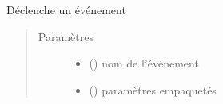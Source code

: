 \documentclass[letterpaper,10pt,french]{sphinxmanual}
\begin{document}
\begin{fulllineitems}
\begin{fulllineitems}
\label{\detokenize{executeurcomponents:executeurcomponents.BaseComponent.trigger}}
Déclenche un événement
\begin{quote}\begin{description}
\item[{Paramètres}] \leavevmode\begin{itemize}
\item {} 
 () \textendash{} nom de l’événement

\item {} 
 (\sphinxstyleliteralemphasis{\sphinxupquote{{[}}}\sphinxstyleliteralemphasis{\sphinxupquote{,}}\sphinxstyleliteralemphasis{\sphinxupquote{{]}}}) \textendash{} paramètres empaquetés

\end{itemize}

\end{description}\end{quote}

\end{fulllineitems}


\end{fulllineitems}

\end{document}
